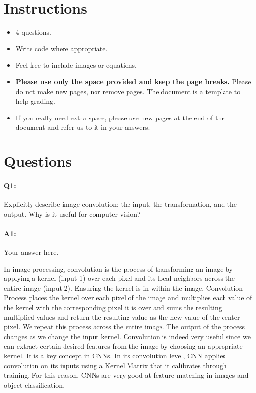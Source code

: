 	\maketitle
	\vspace{-3cm}
	\thispagestyle{fancy}
	
	\section*{Instructions}
	\begin{itemize}
		\item 4 questions.
		\item Write code where appropriate.
		\item Feel free to include images or equations.
		\item \textbf{Please use only the space provided and keep the page breaks.} Please do not make new pages, nor remove pages. The document is a template to help grading.
		\item If you really need extra space, please use new pages at the end of the document and refer us to it in your answers.
	\end{itemize}

	\section*{Questions}
	
	\paragraph{Q1:} Explicitly describe image convolution: the input, the transformation, and the output. Why is it useful for computer vision?
	
	\paragraph{A1:} Your answer here.
	
	In image processing, convolution is the process of transforming an image by applying a kernel (input 1) over each pixel and its local neighbors across the entire image (input 2). Ensuring the kernel is in within the image, Convolution Process places the kernel over each pixel of the image and multiplies each value of the kernel with the corresponding pixel it is over and sums the resulting multiplied values and return the resulting value as the new value of the center pixel. We repeat this process across the entire image. The output of the process changes as we change the input kernel. Convolution is indeed very useful since we can extract certain desired features from the image by choosing an appropriate kernel. It is a key concept in CNNs. In its convolution level, CNN applies convolution on its inputs using a Kernel Matrix that it calibrates through training. For this reason, CNNs are very good at feature matching in images and object classification.
	
